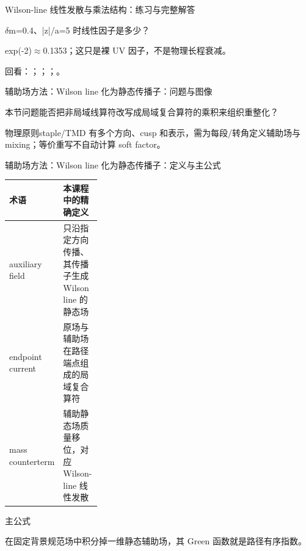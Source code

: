 \begin{frame}[t]{Wilson-line 线性发散与乘法结构：练习与完整解答}
\footnotesize
\begin{block}{}\ensuremath{\delta}m=0.4、|z|/\allowbreak{}a=5 时线性因子是多少？\end{block}
\begin{exampleblock}{}exp(-2)\ensuremath{\approx}0.1353；这只是裸 UV 因子，不是物理长程衰减。\end{exampleblock}
\vfill
\scriptsize 回看：；；；。
\end{frame}

\begin{frame}[t]{辅助场方法：Wilson line 化为静态传播子：问题与图像}
\footnotesize
\begin{block}{本节问题}能否把非局域线算符改写成局域复合算符的乘积来组织重整化？\end{block}
\begin{block}{物理原则}\quad staple/\allowbreak{}TMD 有多个方向、cusp 和表示，需为每段/\allowbreak{}转角定义辅助场与 mixing；等价重写不自动计算 soft factor。\end{block}
\end{frame}

\begin{frame}[t]{辅助场方法：Wilson line 化为静态传播子：定义与主公式}
\footnotesize\begin{tabularx}{\linewidth}{p{0.30\linewidth}Y}
\toprule 术语 & 本课程中的精确定义\\\midrule
{} auxiliary field & 只沿指定方向传播、其传播子生成 Wilson line 的静态场\\
 endpoint current & 原场与辅助场在路径端点组成的局域复合算符\\
 mass counterterm & 辅助静态场质量移位，对应 Wilson-line 线性发散\\
\bottomrule\end{tabularx}\vspace{0.15cm}
\begin{block}{ 主公式}\centering{}\end{block}
在固定背景规范场中积分掉一维静态辅助场，其 Green 函数就是路径有序指数。
\end{frame}

